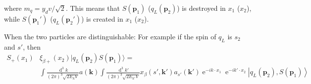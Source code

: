 where $m_q=y_d v/\sqrt{2}$. This means that $S(\mathbf{p}_1)$ ($q_L(\mathbf{p}_2)$) is destroyed in $x_1$ ($x_2$), while
$S(\mathbf{p}_1')$ ($q_L(\mathbf{p}_2')$) is created in $x_1$ ($x_2$).


When the two particles are distinguishable: For example if the spin of $q_L$ is $s_2$ and $s'$, then %
\begin{align}
  S_{+}(x_1)&\xi_{\beta +}(x_2)|q_L(\mathbf{p}_2)S(\mathbf{p}_1)\rangle= \nonumber\\
&\int\frac{\operatorname{d}^3k}{(2\pi)^3\sqrt{2E_k V}}a(\mathbf{k})\int\frac{\operatorname{d}^3k'}{(2\pi)^3\sqrt{2E_{k'}V}} 
           x_\beta(s',\mathbf{k}')a_{s'}(\mathbf{k}')\operatorname{e}^{-i k\cdot x_1}\operatorname{e}^{-i k'\cdot x_2} \left| q_L\left(\mathbf{p}_2\right), S \left(\mathbf{p}_1\right)\right\rangle\\ \nonumber
\end{align}

